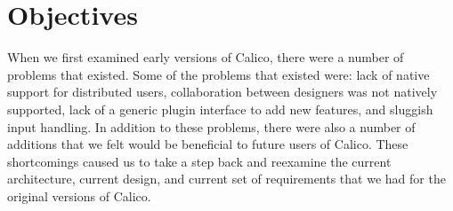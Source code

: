 \chapter{Objectives}

When we first examined early versions of Calico, there were a number of problems that existed. 
Some of the problems that existed were: lack of native support for distributed users,
collaboration between designers was not natively supported,
lack of a generic plugin interface to add new features, 
and sluggish input handling. 
In addition to these problems, there were also a number of additions that we felt would be beneficial to future users of Calico.
These shortcomings caused us to take a step back and reexamine the current architecture, current design, and current set of requirements that we had for the original versions of Calico.



